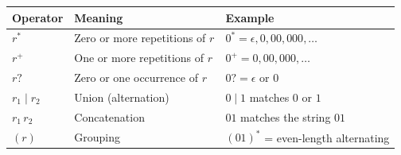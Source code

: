 \documentclass[12pt]{exam}
\begin{document}
\begin{questions}
\begin{tabular}{lll}
  \toprule
  \textbf{Operator} & \textbf{Meaning} & \textbf{Example} \\
  \midrule
  $r^*$   & Zero or more repetitions of $r$  & $0^* = \epsilon, 0, 00, 000, \ldots$ \\
  $r^+$   & One or more repetitions of $r$   & $0^+ = 0, 00, 000, \ldots$ \\
  $r?$    & Zero or one occurrence of $r$    & $0? = \epsilon \text{ or } 0$ \\
  $r_1 \mid r_2$ & Union (alternation)       & $0 \mid 1$ matches $0$ or $1$ \\
  $r_1\,r_2$  & Concatenation              & $01$ matches the string $01$ \\
  $(r)$   & Grouping                         & $(01)^*$ = even-length alternating \\
  \bottomrule
\end{tabular}

\end{questions}
\end{document}
